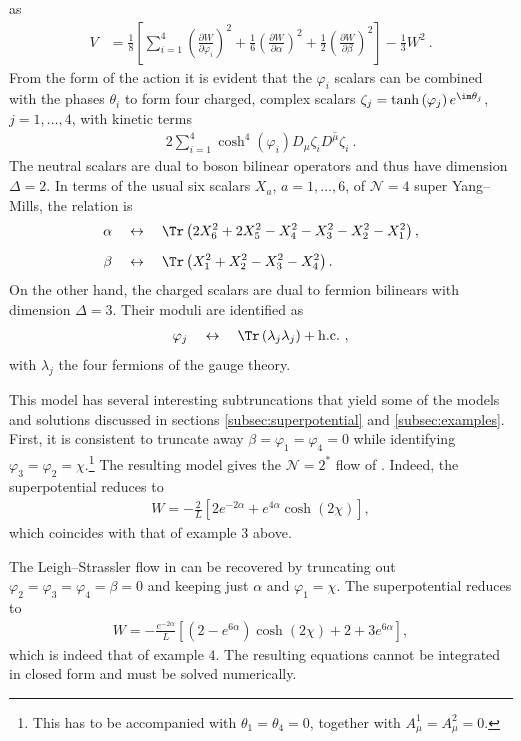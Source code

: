 as
\begin{align}
V&=\frac18\left[\sum_{i=1}^4\left(\frac{\partial W}{\partial\varphi_i}\right)^2+\frac16\left(\frac{\partial W}{\partial\alpha}\right)^2+\frac12\left(\frac{\partial W}{\partial\beta}\right)^2\right]-\frac13W^2\ .\nonumber
\end{align}
From the form of the action it is evident that the $\varphi_i$ scalars can be combined with the phases $\theta_i$ to form four charged, complex scalars $\zeta_j=\tanh{(\varphi_j)}\,e^{\im\theta_j}$, $j=1,\dots,4$, with kinetic terms 
\begin{align}
2\sum_{i=1}^4\cosh^4(\varphi_i)D_\mu\zeta_i\overline{D^\mu\zeta_i}\ .
\end{align}
The neutral scalars are dual to boson bilinear operators and thus have dimension $\Delta=2$. In terms of the usual six scalars $X_a$, $a=1,\dots,6$, of $\mathcal{N}=4$ super Yang--Mills, the relation is
\begin{align}
\alpha\quad&\leftrightarrow\quad \Tr\left(2X_6^2+2X_5^2-X_4^2-X_3^2-X_2^2-X_1^2\right),\nonumber\\[2mm]
\beta\quad&\leftrightarrow\quad\Tr\left(X_1^2+X_2^2-X_3^2-X_4^2\right).
\end{align}
On the other hand, the charged scalars are dual to fermion bilinears with dimension $\Delta=3$. Their moduli are identified as 
\begin{align}
\varphi_j\quad\leftrightarrow\quad\Tr\left(\lambda_j\lambda_j\right)+{\rm h.c.}\ ,
\end{align}
with $\lambda_j$ the four fermions of the gauge theory. 

This model has several interesting subtruncations that yield some of the models and solutions discussed in sections \ref{subsec:superpotential} and \ref{subsec:examples}. First, it is consistent to truncate away $\beta=\varphi_1=\varphi_4=0$ while identifying $\varphi_3=\varphi_2=\chi$.\footnote{This has to be accompanied with $\theta_1=\theta_4=0$, together with $A^1_\mu=A^2_\mu=0$.} The resulting model gives the $\mathcal{N}=2^*$ flow of \cite{Pilch:2000ue}. Indeed, the superpotential reduces to 
\begin{align}
W=-\frac{2}{L}\left[2e^{-2\alpha}+e^{4\alpha}\cosh(2\chi)\right],
\end{align}
which coincides with that of example 3 above.

The Leigh--Strassler flow in \cite{Pilch:2000fu} can be recovered by truncating out $\varphi_2=\varphi_3=\varphi_4=\beta=0$ and keeping just $\alpha$ and $\varphi_1=\chi$. The superpotential reduces to 
\begin{align}
  W=-\frac{e^{-2\alpha}}{L}\left[\left(2-e^{6\alpha}\right)\cosh(2\chi)+2+3e^{6\alpha}\right],  
\end{align}
which is indeed that of example 4. The resulting equations cannot be integrated in closed form and must be solved numerically. 

